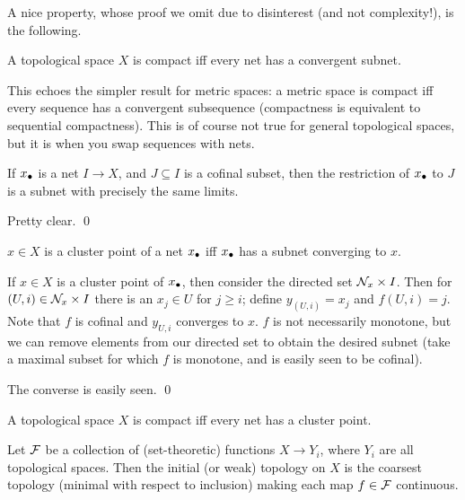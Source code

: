A nice property, whose proof we omit due to disinterest (and not complexity!), is the following.

\bprop

    A topological space $X$ is compact iff every net has a convergent subnet.

\eprop

This echoes the simpler result for metric spaces: a metric space is compact iff every sequence has a convergent subsequence (compactness is equivalent to sequential
compactness).
This is of course not true for general topological spaces, but it is when you swap sequences with nets.

\blemm

    If $x_\bullet$ is a net $I\to X$, and $J\subseteq I$ is a cofinal subset, then the restriction of $x_\bullet$ to $J$ is a subnet with precisely
    the same limits.

\elemm

\bproof

    Pretty clear.
    \qed

\eproof

\bprop

    $x\in X$ is a cluster point of a net $x_\bullet$ iff $x_\bullet$ has a subnet converging to $x$.

\eprop

\bproof

    If $x\in X$ is a cluster point of $x_\bullet$, then consider the directed set ${{\cal N}}_x\times I$.
    Then for $(U,i)\in{{\cal N}}_x\times I$ there is an $x_j\in U$ for $j\geq i$; define $y_{(U,i)}=x_j$ and $f(U,i)=j$.
    Note that $f$ is cofinal and $y_{U,i}$ converges to $x$.
    $f$ is not necessarily monotone, but we can remove elements from our directed set to obtain the desired subnet
    (take a maximal subset for which $f$ is monotone, and is easily seen to be cofinal).

    The converse is easily seen.
    \qed

\eproof

\bcoro

    A topological space $X$ is compact iff every net has a cluster point.

\ecoro

\bdefn

    Let ${{\cal F}}$ be a collection of (set-theoretic) functions $X\to Y_i$, where $Y_i$ are all topological spaces.
    Then the {\emphcolor initial} (or {\emphcolor weak}) topology on $X$ is the coarsest topology (minimal with respect to inclusion) making each map $f\in{{\cal F}}$
    continuous.

